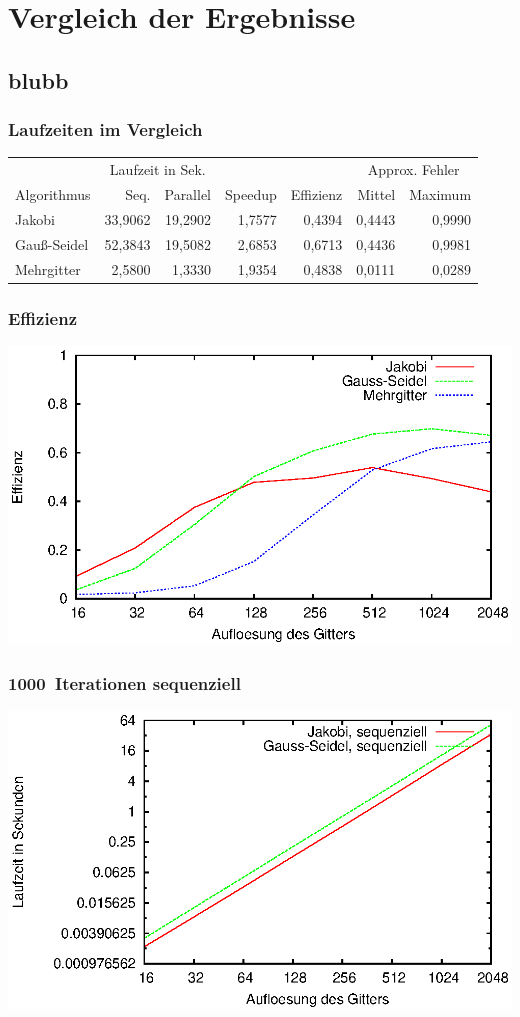 \documentclass{beamer}
\begin{document}
\section{Vergleich der Ergebnisse}
\subsection*{blubb}
\begin{frame}
    \frametitle{Laufzeiten im Vergleich}
    \footnotesize
    \begin{tabular}{|l|r|r|r|r|r|r|} \hline
    & \multicolumn{2}{c|}{Laufzeit in Sek.} & & & \multicolumn{2}{c|}{Approx. Fehler} \\
    Algorithmus & Seq.    & Parallel & Speedup & Effizienz & Mittel   & Maximum \\ \hline \hline
    Jakobi      & 33,9062 & 19,2902  & 1,7577  & 0,4394    & 0,4443   & 0,9990  \\
    Gauß-Seidel & 52,3843 & 19,5082  & 2,6853  & 0,6713    & 0,4436   & 0,9981  \\
    Mehrgitter  & 2,5800  & 1,3330   & 1,9354  & 0,4838    & 0,0111   & 0,0289  \\ \hline
    \end{tabular}
\end{frame}

\begin{frame}
    \frametitle{Effizienz}
    \includegraphics[width=\textwidth]{plots/effizienz}
\end{frame}

\begin{frame}
    \frametitle{1000~Iterationen sequenziell}
    \includegraphics[width=\textwidth]{plots/laufzeitensequenziell}
\end{frame}
\end{document}
